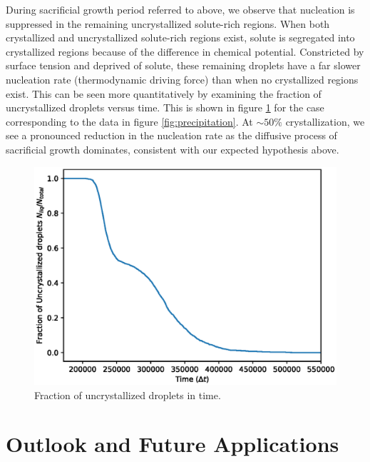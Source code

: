\documentclass[showkeys, prb, reprint]{revtex4-1}
\begin{document}

During sacrificial growth period referred to above, we observe that nucleation
is suppressed in the remaining uncrystallized solute-rich regions. When both
crystallized and uncrystallized solute-rich regions exist, solute is segregated
into crystallized regions because of the difference in chemical potential.
Constricted by surface tension and deprived of solute, these remaining droplets
have a far slower nucleation rate (thermodynamic driving force) than when no
crystallized regions exist. This can be seen more quantitatively by examining
the fraction of uncrystallized droplets versus time. This is shown in figure
\ref{fig:incubation} for the case corresponding to the data in figure
\ref{fig:precipitation}. At $\sim 50\%$ crystallization, we see a pronounced
reduction in the nucleation rate as the diffusive process of sacrificial growth
dominates, consistent with our expected hypothesis above.
%
\begin{figure}
    \centering
    \includegraphics[width=\columnwidth]{incubation}
    \caption[Fraction of uncrystallized droplets in time]{
        \label{fig:incubation}
        Fraction of uncrystallized droplets in time.
    }
\end{figure}

\section{Outlook and Future Applications} %
\end{document}
